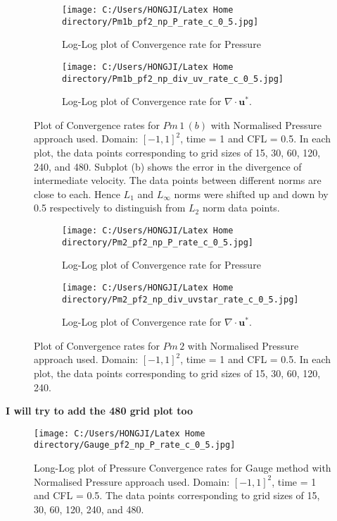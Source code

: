 \begin{figure}[H]
	\centering
	\begin{subfigure}[t]{4.5in}
		\centering
		\texttt{[image: C:/Users/HONGJI/Latex Home directory/Pm1b\_pf2\_np\_P\_rate\_c\_0\_5.jpg]}
		\caption{Log-Log plot of Convergence rate for Pressure}\label{fig:6.19a}		
	\end{subfigure}
	\quad
	\begin{subfigure}[t]{4.5in}
		\centering
		\texttt{[image: C:/Users/HONGJI/Latex Home directory/Pm1b\_pf2\_np\_div\_uv\_rate\_c\_0\_5.jpg]}
		\caption{Log-Log plot of Convergence rate for $\nabla \cdot \textbf{u}^*$. }\label{fig:6.19b}
	\end{subfigure}
	\caption{Plot of Convergence rates for $Pm\,1\,(b)$ with Normalised Pressure approach used. Domain: $[-1,1]^2$, time = 1 and CFL = 0.5. In each plot, the data points corresponding to grid sizes of 15, 30, 60, 120, 240, and 480. Subplot (b) shows the error in the divergence of intermediate velocity. The data points between different norms are close to each. Hence $L_1$ and $L_\infty$ norms were shifted up and down by 0.5 respectively to distinguish from $L_2$ norm data points.}\label{fig:6.16}
\end{figure}

\begin{figure}[H]
	\centering
	\begin{subfigure}[t]{4.5in}
		\centering
		\texttt{[image: C:/Users/HONGJI/Latex Home directory/Pm2\_pf2\_np\_P\_rate\_c\_0\_5.jpg]}
		\caption{Log-Log plot of Convergence rate for Pressure}\label{fig:6.19a}		
	\end{subfigure}
	\quad
	\begin{subfigure}[t]{4.5in}
		\centering
		\texttt{[image: C:/Users/HONGJI/Latex Home directory/Pm2\_pf2\_np\_div\_uvstar\_rate\_c\_0\_5.jpg]}
		\caption{Log-Log plot of Convergence rate for $\nabla \cdot \textbf{u}^*$. }\label{fig:6.19b}
	\end{subfigure}
	\caption{Plot of Convergence rates for $Pm\,2$ with Normalised Pressure approach used. Domain: $[-1,1]^2$, time = 1 and CFL = 0.5. In each plot, the data points corresponding to grid sizes of 15, 30, 60, 120, 240.}\label{fig:6.16}
\end{figure}
\textbf{I will try to add the 480 grid plot too}

\begin{figure}[H]
	\centering
	\texttt{[image: C:/Users/HONGJI/Latex Home directory/Gauge\_pf2\_np\_P\_rate\_c\_0\_5.jpg]}
	\caption{Long-Log plot of Pressure Convergence rates for Gauge method with Normalised Pressure approach used. Domain: $[-1,1]^2$, time = 1 and CFL = 0.5. The data points corresponding to grid sizes of 15, 30, 60, 120, 240, and 480.}\label{fig:6.16}
\end{figure}


